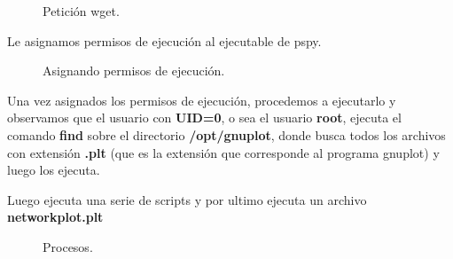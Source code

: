 \documentclass[a4paper]{article} %
\begin{document}
    \begin{figure}[h] %
        \begin{center}
        \setlength{\fboxsep}{0.2em} %
        \end{center}
        \captionsetup{labelfont=bf} %
        \caption{Petición wget.}
    \end{figure}

    \vspace{9cm}

    Le asignamos permisos de ejecución al ejecutable de pspy.

    \begin{figure}[h] %
        \begin{center}
        \setlength{\fboxsep}{0.2em} %
        \end{center}
        \captionsetup{labelfont=bf} %
        \caption{Asignando permisos de ejecución.}
    \end{figure}

    Una vez asignados los permisos de ejecución, procedemos a ejecutarlo y observamos que el usuario con \textbf{UID=0}, o sea el usuario \textbf{root}, ejecuta el comando \textbf{find} sobre el directorio \textbf{/opt/gnuplot}, donde busca todos los archivos con extensión \textbf{.plt} (que es la extensión que corresponde al programa gnuplot) y luego los ejecuta.

    Luego ejecuta una serie de scripts y por ultimo ejecuta un archivo \textbf{networkplot.plt}

    \begin{figure}[h] %
        \begin{center}
        \setlength{\fboxsep}{0.2em} %
        \end{center}
        \captionsetup{labelfont=bf} %
        \caption{Procesos.}
    \end{figure}
\end{document}
